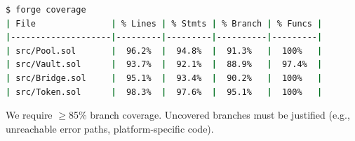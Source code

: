 \begin{lstlisting}[language=bash,caption={Foundry coverage report}]
$ forge coverage
| File               | % Lines | % Stmts | % Branch | % Funcs |
|--------------------|---------|---------|----------|---------|
| src/Pool.sol       |  96.2%  |  94.8%  |  91.3%   |  100%   |
| src/Vault.sol      |  93.7%  |  92.1%  |  88.9%   |  97.4%  |
| src/Bridge.sol     |  95.1%  |  93.4%  |  90.2%   |  100%   |
| src/Token.sol      |  98.3%  |  97.6%  |  95.1%   |  100%   |
\end{lstlisting}

We require $\geq$85\% branch coverage. Uncovered branches must be justified (e.g.,
unreachable error paths, platform-specific code).

